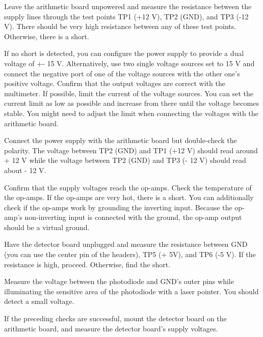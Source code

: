 
Leave the arithmetic board unpowered and measure the resistance between the supply lines through the test points TP1 (+12 V), TP2 (GND), and TP3 (-12 V).
There should be very high resistance between any of these test points.
Otherwise, there is a short.

If no short is detected, you can configure the power supply to provide a dual voltage of +- 15 V.
Alternatively, use two single voltage sources set to 15 V and connect the negative port of one of the voltage sources with the other one's positive voltage.
Confirm that the output voltages are correct with the multimeter. If possible, limit the current of the voltage sources.
You can set the current limit as low as possible and increase from there until the voltage becomes stable.
You might need to adjust the limit when connecting the voltages with the arithmetic board.

Connect the power supply with the arithmetic board but double-check the polarity.
The voltage between TP2 (GND) and TP1 (+12 V) should read around + 12 V while the voltage between TP2 (GND) and TP3 (- 12 V) should read about - 12 V.

Confirm that the supply voltages reach the op-amps.
Check the temperature of the op-amps.
If the op-amps are very hot, there is a short.
You can additionally check if the op-amps work by grounding the inverting input.
Because the op-amp's non-inverting input is connected with the ground, the op-amp output should be a virtual ground.


Have the detector board unplugged and measure the resistance between GND (you can use the center pin of the headers), TP5 (+ 5V), and TP6 (-5 V). If the resistance is high, proceed. Otherwise, find the short.

Measure the voltage between the photodiode and GND's outer pins while illuminating the sensitive area of the photodiode with a laser pointer.
You should detect a small voltage.

If the preceding checks are successful, mount the detector board on the arithmetic board, and measure the detector board's supply voltages.

